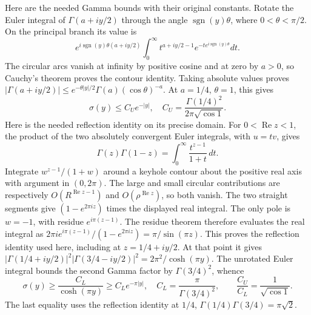 Here are the needed Gamma bounds with their original constants.
Rotate the Euler integral of $\Gamma(a+iy/2)$ through the angle
$\operatorname{sgn}(y)\theta$, where $0<\theta<\pi/2$.
On the principal branch its value is
\[
 e^{i\operatorname{sgn}(y)\theta(a+iy/2)}
 \int_0^\infty t^{a+iy/2-1}
                  e^{-t e^{i\operatorname{sgn}(y)\theta}}dt.
\]
The circular arcs vanish at infinity by positive cosine and
at zero by $a>0$, so Cauchy's theorem proves the contour
identity. Taking absolute values proves
$|\Gamma(a+iy/2)|\leq e^{-\theta|y|/2}
\Gamma(a)(\cos\theta)^{-a}$. At $a=1/4$, $\theta=1$, this gives
\[
 \sigma(y)\leq C_Ue^{-|y|},\quad
 C_U=\frac{\Gamma(1/4)^2}{2\pi\sqrt{\cos1}}.
\tag{BRD23}
\]
Here is the needed reflection identity on its precise domain.
For $0<\operatorname{Re}z<1$, the product of the two absolutely
convergent Euler integrals, with $u=tv$, gives
\[
 \Gamma(z)\Gamma(1-z)=\int_0^\infty\frac{t^{z-1}}{1+t}\,dt.
\]
Integrate $w^{z-1}/(1+w)$ around a keyhole contour about the
positive real axis with argument in $(0,2\pi)$. The large and
small circular contributions are respectively
$O(R^{\operatorname{Re}z-1})$ and
$O(\rho^{\operatorname{Re}z})$, so both vanish. The two straight
segments give $(1-e^{2\pi iz})$ times the displayed real integral.
The only pole is $w=-1$, with residue $e^{i\pi(z-1)}$. The
residue theorem therefore evaluates the real integral as
$2\pi i e^{i\pi(z-1)}/(1-e^{2\pi iz})=\pi/\sin(\pi z)$.
This proves the reflection identity used here, including at
$z=1/4+iy/2$. At that point it gives
$|\Gamma(1/4+iy/2)|^2|\Gamma(3/4-iy/2)|^2
=2\pi^2/\cosh(\pi y)$.
The unrotated Euler integral bounds the second Gamma factor
by $\Gamma(3/4)^2$, whence
\[
 \sigma(y)\geq\frac{C_L}{\cosh(\pi y)}
       \geq C_Le^{-\pi|y|},\quad
 C_L=\frac{\pi}{\Gamma(3/4)^2},\qquad
 \frac{C_U}{C_L}=\frac1{\sqrt{\cos1}}.
\tag{BRD24}
\]
The last equality uses the reflection identity at $1/4$,
$\Gamma(1/4)\Gamma(3/4)=\pi\sqrt2$.

